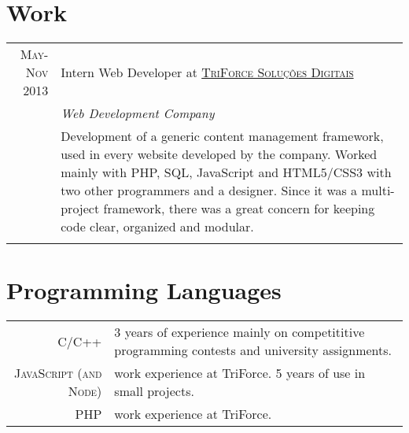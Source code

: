 \documentclass[a4paper,10pt]{article} %
\begin{document}


\section{Work}

\begin{tabular}{r|p{11cm}}
\textsc{May-Nov 2013} & Intern Web Developer at \textsc{\href{http://www.3force.com.br/}{TriForce Soluções Digitais}} \\
& \hfill \hfill \textit{Web Development Company} \\
& \footnotesize{Development of a generic content management framework, used in every website developed by the company. Worked mainly with PHP, SQL, JavaScript and HTML5/CSS3 with two other programmers and a designer. Since it was a multi-project framework, there was a great concern for keeping code clear, organized and modular.} \\
\multicolumn{2}{c}{} \\

\end{tabular}


\section{Programming Languages}

\begin{tabular}{rp{10cm}}
\textsc{C/C++}                 & \footnotesize{3 years of experience mainly on competititive programming contests and university assignments.} \\[0.4cm]
\textsc{JavaScript (and Node)} & \footnotesize{work experience at TriForce. 5 years of use in small projects.} \\[0.4cm]
\textsc{PHP}       & \footnotesize{work experience at TriForce.} \\
\end{tabular}

\end{document}
